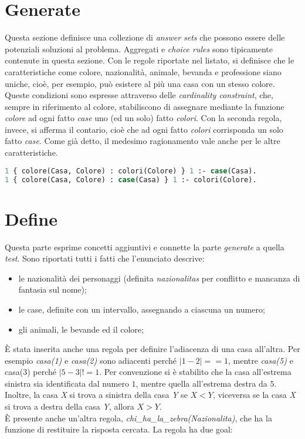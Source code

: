 \documentclass[12pt]{report}
\begin{document}
\section{Generate}
Questa sezione definisce una collezione di \emph{answer sets} che possono essere delle potenziali soluzioni al problema. Aggregati e \emph{choice rules} sono tipicamente contenute in questa sezione.
Con le regole riportate nel listato, si definisce che le caratteristiche come colore, nazionalità, animale, bevanda e professione siano uniche, cioè, per esempio, può esistere al più una casa con un stesso colore. 
Queste condizioni sono espresse attraverso delle \emph{cardinality constraint}, che, sempre in riferimento al colore, stabiliscono di assegnare mediante la funzione \emph{colore} ad ogni fatto \emph{case} uno (ed un solo) fatto \emph{colori}. Con la seconda regola, invece, si afferma il contario, cioè che ad ogni fatto \emph{colori} corrisponda un solo fatto \emph{case}.
Come già detto, il medesimo ragionamento vale anche per le altre caratteristiche.

\begin{lstlisting}[language=lisp]
% Colore
1 { colore(Casa, Colore) : colori(Colore) } 1 :- case(Casa).
1 { colore(Casa, Colore) : case(Casa) } 1 :- colori(Colore).
\end{lstlisting}

\section{Define}
Questa parte esprime concetti aggiuntivi e connette la parte \emph{generate} a quella \emph{test}.
Sono riportati tutti i fatti che l'enunciato descrive:

\begin{itemize}
\item le nazionalità dei personaggi (definita \emph{nazionalitas} per conflitto e mancanza di fantasia sul nome);
\item le case, definite con un intervallo, assegnando a ciascuna un numero;
\item gli animali, le bevande ed il colore;
\end{itemize}

È stata inserita anche una regola per definire l'adiacenza di una casa all'altra. Per esempio \emph{casa(1)} e \emph{casa(2)} sono adiacenti perché $|1 - 2 | == 1$, mentre \emph{casa(5)} e {casa(3)} perché $|5 - 3| != 1$.
Per convenzione si è stabilito che la casa all'estrema sinistra sia identificata dal numero $1$, mentre quella all'estrema destra da $5$. Inoltre, la casa \emph{X} si trova a sinistra della casa \emph{Y} se $X < Y$, viceversa se la casa \emph{X} si trova a destra della casa \emph{Y}, allora $X > Y$.\\
È presente anche un'altra regola, \emph{chi\_ha\_la\_zebra(Nazionalita)}, che ha la funzione di restituire la risposta cercata. La regola ha due goal:
\end{document}
